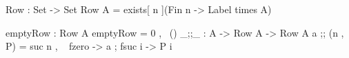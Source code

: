 \begin{agdaf} 
Row : Set -> Set
Row A = exists[ n ](Fin n -> Label times A)

emptyRow : Row A
emptyRow = 0 , \ ()
_;;_ : A -> Row A -> Row A 
a ;; (n , P) = suc n , \ { fzero -> a
                         ; fsuc i -> P i }
\end{agdaf}
